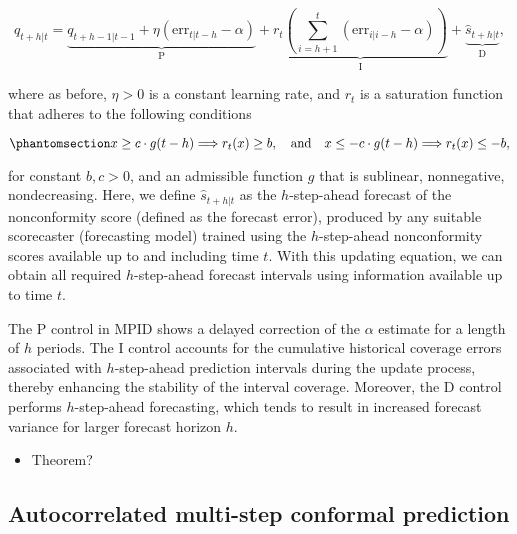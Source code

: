 \documentclass[
  11pt,
  a4paper,
]{article}
\providecommand{\tightlist}{%
  \setlength{\itemsep}{0pt}\setlength{\parskip}{0pt}}\usepackage{longtable,booktabs,array}
\theoremstyle{plain}
\theoremstyle{plain}
\theoremstyle{remark}
\begin{document}
\[
q_{t+h|t}=\underbrace{q_{t+h-1|t-1}+\eta \left(\mathrm{err}_{t|t-h}-\alpha\right)}_{\mathrm{P}}+\underbrace{r_t\left(\sum_{i=h+1}^t \left(\mathrm{err}_{i|i-h}-\alpha\right)\right)}_{\mathrm{I}}+\underbrace{\hat{s}_{t+h|t}}_{\mathrm{D}},
\]

where as before, \(\eta > 0\) is a constant learning rate, and \(r_t\)
is a saturation function that adheres to the following conditions

\begin{equation}\phantomsection\label{eq-saturation_h}{
x \geq c \cdot g(t-h) \Longrightarrow r_t(x) \geq b, \quad \text {and} \quad x \leq-c \cdot g(t-h) \Longrightarrow r_t(x) \leq -b,
}\end{equation}

for constant \(b, c > 0\), and an admissible function \(g\) that is
sublinear, nonnegative, nondecreasing. Here, we define
\(\hat{s}_{t+h|t}\) as the \(h\)-step-ahead forecast of the
nonconformity score (defined as the forecast error), produced by any
suitable scorecaster (forecasting model) trained using the
\(h\)-step-ahead nonconformity scores available up to and including time
\(t\). With this updating equation, we can obtain all required
\(h\)-step-ahead forecast intervals using information available up to
time \(t\).

The P control in MPID shows a delayed correction of the \(\alpha\)
estimate for a length of \(h\) periods. The I control accounts for the
cumulative historical coverage errors associated with \(h\)-step-ahead
prediction intervals during the update process, thereby enhancing the
stability of the interval coverage. Moreover, the D control performs
\(h\)-step-ahead forecasting, which tends to result in increased
forecast variance for larger forecast horizon \(h\).

\begin{itemize}
\tightlist
\item
  Theorem?
\end{itemize}

\subsection{Autocorrelated multi-step conformal
prediction}\label{sec-acmcp}
\end{document}
